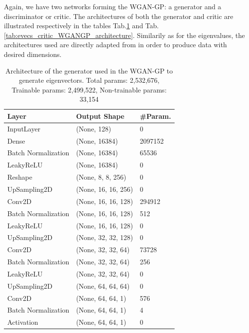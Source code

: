 \documentclass{article}
\begin{document}
Again, we have two networks forming the WGAN-GP: a generator and a discriminator or critic. The architectures of both the generator and critic are illustrated respectively in the tables Tab.\ref{tab:evecs_generator_WGANGP_architecture} and Tab.\ref{tab:evecs_critic_WGANGP_architecture}. Similarily as for the eigenvalues, the architectures used are directly adapted from \cite{nain2020wgangp} in order to produce data with desired dimensions.



\begin{table}[]
    \begin{tabular}{|l|l|l|}
    \hline
    \textbf{Layer}      & \textbf{Output Shape} & \textbf{\#Param.} \\ \hline
    InputLayer          & (None, 128)           & 0                 \\ \hline
    Dense               & (None, 16384)         & 2097152           \\ \hline
    Batch Normalization & (None, 16384)         & 65536             \\ \hline
    LeakyReLU           & (None, 16384)         & 0                 \\ \hline
    Reshape             & (None, 8, 8, 256)     & 0                 \\ \hline
    UpSampling2D        & (None, 16, 16, 256)   & 0                 \\ \hline
    Conv2D              & (None, 16, 16, 128)   & 294912            \\ \hline
    Batch Normalization & (None, 16, 16, 128)   & 512               \\ \hline
    LeakyReLU           & (None, 16, 16, 128)   & 0                 \\ \hline
    UpSampling2D        & (None, 32, 32, 128)   & 0                 \\ \hline
    Conv2D              & (None, 32, 32, 64)    & 73728             \\ \hline
    Batch Normalization & (None, 32, 32, 64)    & 256               \\ \hline
    LeakyReLU           & (None, 32, 32, 64)    & 0                 \\ \hline
    UpSampling2D        & (None, 64, 64, 64)    & 0                 \\ \hline
    Conv2D              & (None, 64, 64, 1)     & 576               \\ \hline
    Batch Normalization & (None, 64, 64, 1)     & 4                 \\ \hline
    Activation          & (None, 64, 64, 1)     & 0                 \\ \hline
    \end{tabular}
    \caption{Architecture of the generator used in the WGAN-GP to generate eigenvectors. Total params: 2,532,676, Trainable params: 2,499,522, Non-trainable params: 33,154}
    \label{tab:evecs_generator_WGANGP_architecture}
\end{table}
\end{document}
